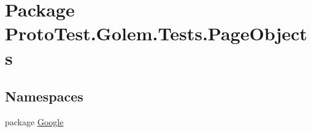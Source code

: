 \hypertarget{namespace_proto_test_1_1_golem_1_1_tests_1_1_page_objects}{\section{Package Proto\-Test.\-Golem.\-Tests.\-Page\-Objects}
\label{namespace_proto_test_1_1_golem_1_1_tests_1_1_page_objects}
}
\subsection*{Namespaces}
\begin{DoxyCompactItemize}
\item 
package \hyperlink{namespace_proto_test_1_1_golem_1_1_tests_1_1_page_objects_1_1_google}{Google}
\end{DoxyCompactItemize}
